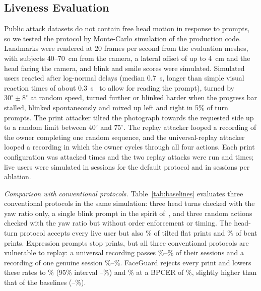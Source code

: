 \documentclass[journal]{IEEEtran}
\newcommand{\sys}{FaceGuard}
\begin{document}
\subsection{Liveness Evaluation}\label{sec:liveres}
Public attack datasets do not contain free head motion in response to prompts, so we tested the protocol by Monte-Carlo simulation of the production code. Landmarks were rendered at 20 frames per second from the evaluation meshes, with subjects 40--70~cm from the camera, a lateral offset of up to 4~cm and the head facing the camera, and blink and smile scores were simulated. Simulated users reacted after log-normal delays (median 0.7~s, longer than simple visual reaction times of about 0.3~s~\cite{tatsuno2016reaction} to allow for reading the prompt), turned by $30^\circ\pm8^\circ$ at random speed, turned further or blinked harder when the progress bar stalled, blinked spontaneously and mixed up left and right in 5\% of turn prompts. The print attacker tilted the photograph towards the requested side up to a random limit between $40^\circ$ and $75^\circ$. The replay attacker looped a recording of the owner completing one random sequence, and the universal-replay attacker looped a recording in which the owner cycles through all four actions. Each print configuration was attacked \attPrintN{} times and the two replay attacks were run \attReplayN{} and \attUniversalN{} times; live users were simulated in \livN{} sessions for the default protocol and in \livNAbl{} sessions per ablation.

\emph{Comparison with conventional protocols.} Table~\ref{tab:baselines} evaluates three conventional protocols in the same simulation: three head turns checked with the yaw ratio only, a single blink prompt in the spirit of~\cite{pan2007eyeblink}, and three random actions checked with the yaw ratio but without order enforcement or timing. The head-turn protocol accepts every live user but also \lbYawFlat\% of tilted flat prints and \lbYawBent\% of bent prints. Expression prompts stop prints, but all three conventional protocols are vulnerable to replay: a universal recording passes \lbUniMin\%--\lbUniMax\% of their sessions and a recording of one genuine session \lbRepMin\%--\lbRepMax\%. \sys{} rejects every print and lowers these rates to \lbFgUni\% (95\% interval \attUniversalFullLo--\attUniversalFullHi\%) and \lbFgReplay\% at a BPCER of \lbFgLive\%, slightly higher than that of the baselines (\lbYawLive--\lbBlinkLive\%).
\end{document}
